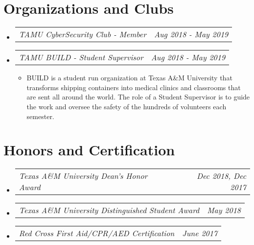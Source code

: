 \documentclass[letterpaper,11pt]{article}
\makeatletter
\newcommand{\resumeAward}[2]{
  \vspace{-1pt}
    \item\begin{tabular*}{0.97\textwidth}{l@{\extracolsep{\fill}}r}
    \textit{\small#1} & \textit{\small #2} \\
    \end{tabular*}\vspace{-20pt}
}
\newcommand{\resumeJobDesc}[1]{
  \item\small{{ #1 \vspace{-2pt}}
  }
}
\newcommand{\resumeSubHeadingListStart}{\begin{itemize}[leftmargin=*]}
\newcommand{\resumeSubHeadingListEnd}{\end{itemize}}
\newcommand{\resumeItemListStart}{\begin{itemize}}
\newcommand{\resumeItemListEnd}{\end{itemize}\vspace{-5pt}}
\makeatother
\begin{document}
\section{Organizations and Clubs}
\resumeSubHeadingListStart
        \resumeAward{TAMU CyberSecurity Club - Member}{Aug 2018 - May 2019}
        \resumeAward{TAMU BUILD - Student Supervisor}{Aug 2018 - May 2019}
        \vspace{3pt}
        \resumeItemListStart
                \resumeJobDesc{BUILD is a student run organization at Texas A\&M University that transforms shipping containers into medical clinics and classrooms that are sent all around the world. The role of a Student Supervisor is to guide the work and oversee the safety of the hundreds of volunteers each semester.}
        \resumeItemListEnd
\resumeSubHeadingListEnd

\section{Honors and Certification}
  \resumeSubHeadingListStart
    \resumeAward{Texas A\&M University Dean's Honor Award}{Dec 2018, Dec 2017}
    \resumeAward{Texas A\&M University Distinguished Student Award}{May 2018}
    \resumeAward{Red Cross First Aid/CPR/AED Certification}{June 2017}
\resumeSubHeadingListEnd
\vspace{5pt}

\end{document}
